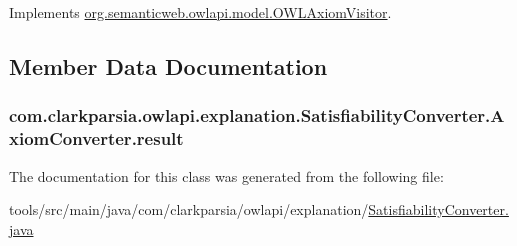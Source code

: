 Implements \hyperlink{interfaceorg_1_1semanticweb_1_1owlapi_1_1model_1_1_o_w_l_axiom_visitor_aaaa73f4e22881ab0ff5659c18ce2977c}{org.\-semanticweb.\-owlapi.\-model.\-O\-W\-L\-Axiom\-Visitor}.



\subsection{Member Data Documentation}
\hypertarget{classcom_1_1clarkparsia_1_1owlapi_1_1explanation_1_1_satisfiability_converter_1_1_axiom_converter_aca755a16389b2243793fa9786487d95e}{
\subsubsection[{result}]{ com.\-clarkparsia.\-owlapi.\-explanation.\-Satisfiability\-Converter.\-Axiom\-Converter.\-result\hspace{0.3cm}{\ttfamily [private]}}}\label{classcom_1_1clarkparsia_1_1owlapi_1_1explanation_1_1_satisfiability_converter_1_1_axiom_converter_aca755a16389b2243793fa9786487d95e}


The documentation for this class was generated from the following file\-:\begin{DoxyCompactItemize}
\item 
tools/src/main/java/com/clarkparsia/owlapi/explanation/\hyperlink{_satisfiability_converter_8java}{Satisfiability\-Converter.\-java}\end{DoxyCompactItemize}

